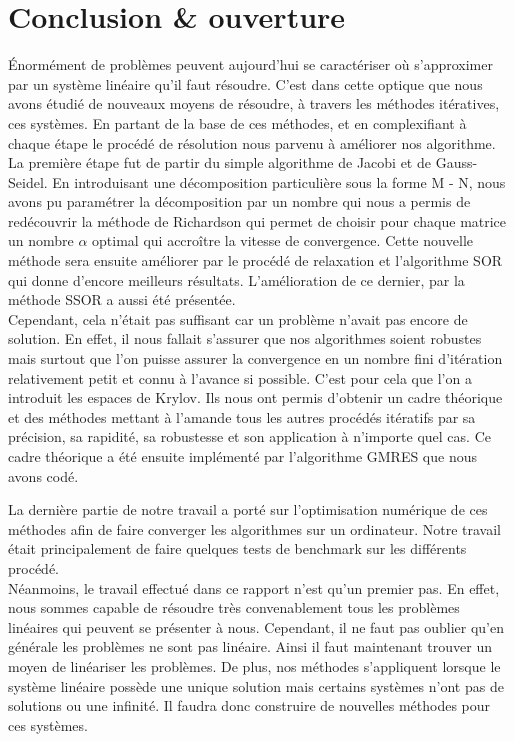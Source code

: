 \chapter{Conclusion \& ouverture}

Énormément de problèmes peuvent aujourd'hui se caractériser où s'approximer par un système linéaire qu'il faut résoudre. C'est dans cette optique que nous avons étudié de nouveaux moyens de résoudre, à travers les méthodes itératives, ces systèmes. En partant de la base de ces méthodes, et en complexifiant à chaque étape le procédé de résolution nous parvenu à améliorer nos algorithme.\\

La première étape fut de partir du simple algorithme de Jacobi et de Gauss-Seidel. En introduisant une décomposition particulière sous la forme M - N, nous avons pu paramétrer la décomposition par un nombre qui nous a permis de redécouvrir la méthode de Richardson qui permet de choisir pour chaque matrice un nombre $\alpha$ optimal qui accroître la vitesse de convergence. Cette nouvelle méthode sera ensuite améliorer par le procédé de relaxation et l'algorithme SOR qui donne d'encore meilleurs résultats. L'amélioration de ce dernier, par la méthode SSOR a aussi été présentée. \\

Cependant, cela n'était pas suffisant car un problème n'avait pas encore de solution. En effet, il nous fallait s'assurer que nos algorithmes soient robustes mais surtout que l'on puisse assurer la convergence en un nombre fini d'itération relativement petit et connu à l'avance si possible. C'est pour cela que l'on a introduit les espaces de Krylov. Ils nous ont permis d'obtenir un cadre théorique et des méthodes mettant à l'amande tous les autres procédés itératifs par sa précision, sa rapidité, sa robustesse et son application à n'importe quel cas. Ce cadre théorique a été ensuite implémenté par l'algorithme GMRES que nous avons codé. 

La dernière partie de notre travail a porté sur l'optimisation numérique de ces méthodes afin de faire converger les algorithmes sur un ordinateur. Notre travail était principalement de faire quelques tests de benchmark sur les différents procédé.\\ 

Néanmoins, le travail effectué dans ce rapport n'est qu'un premier pas. En effet, nous sommes capable de résoudre très convenablement tous les problèmes linéaires qui peuvent se présenter à nous. Cependant, il ne faut pas oublier qu'en générale les problèmes ne sont pas linéaire. Ainsi il faut maintenant trouver un moyen de linéariser les problèmes. De plus, nos méthodes s'appliquent lorsque le système linéaire possède une unique solution mais certains systèmes n'ont pas de solutions ou une infinité. Il faudra donc construire de nouvelles méthodes pour ces systèmes.